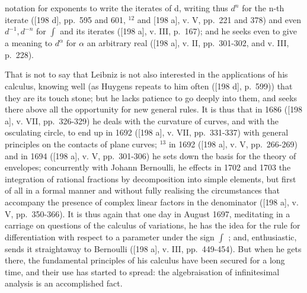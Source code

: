 notation for exponents to write the iterates of d, writing thus \(d^{n}\) for the n-th iterate ({[}198 d{]}, pp.~595 and 601, \(^{12}\) and {[}198 a{]}, v. V, pp.~221 and 378) and even \(d^{-1}, d^{-n}\) for \(\int\) and its iterates ({[}198 a{]}, v. III, p.~167); and he seeks even to give a meaning to \(d^{\alpha}\) for \(\alpha\) an arbitrary real ({[}198 a{]}, v. II, pp.~301-302, and v. III, p.~228).

That is not to say that Leibniz is not also interested in the applications of his calculus, knowing well (as Huygens repeats to him often ({[}198 d{]}, p.~599)) that they are its touch stone; but he lacks patience to go deeply into them, and seeks there above all the opportunity for new general rules. It is thus that in 1686 ({[}198 a{]}, v. VII, pp.~326-329) he deals with the curvature of curves, and with the osculating circle, to end up in 1692 ({[}198 a{]}, v. VII, pp.~331-337) with general principles on the contacts of plane curves; \(^{13}\) in 1692 ({[}198 a{]}, v. V, pp.~266-269) and in 1694 ({[}198 a{]}, v. V, pp.~301-306) he sets down the basis for the theory of envelopes; concurrently with Johann Bernoulli, he effects in 1702 and 1703 the integration of rational fractions by decomposition into simple elements, but first of all in a formal manner and without fully realising the circumstances that accompany the presence of complex linear factors in the denominator ({[}198 a{]}, v. V, pp.~350-366). It is thus again that one day in August 1697, meditating in a carriage on questions of the calculus of variations, he has the idea for the rule for differentiation with respect to a parameter under the sign \(\int\) ; and, enthusiastic, sends it straightaway to Bernoulli ({[}198 a{]}, v. III, pp.~449-454). But when he gets there, the fundamental principles of his calculus have been secured for a long time, and their use has started to spread: the algebraisation of infinitesimal analysis is an accomplished fact.

